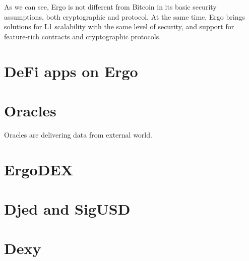 \documentclass{article}   %
\begin{document}
As we can see, Ergo is not different from Bitcoin in its basic security assumptions, both cryptographic and protocol. At the same time, Ergo brings solutions for L1 scalability with the same level of security, and support for feature-rich contracts and cryptographic protocols. 


\section{DeFi apps on Ergo}

\section{Oracles}

Oracles are delivering data from external world. 

\section{ErgoDEX}

\section{Djed and SigUSD}

\section{Dexy}


%



\newpage

 



%
\end{document}
